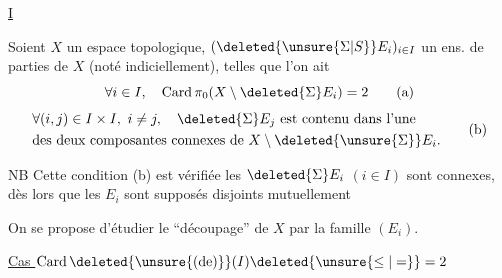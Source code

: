 \begingroup
\makeatletter
\tagsleft@true
\makeatother
\uline{ I}

Soient $X$ un espace topologique, $(\deleted{\unsure{\Sigma|S}}E_i)_{i\in I}$ un ens. de parties  de $X$ (noté indiciellement), telles que l'on ait
\reversemarginpar
{}
\normalmarginpar
\[
 \forall i\in I,\quad \operatorname{Card}\pi_0(X\setminus\deleted{\Sigma}E_i)=2
 \tag*{(a)}
\]
\[
 \begin{aligned}
 &\forall(i,j)\in I\times I,\ i\ne j,\quad \deleted{\Sigma}E_j\ \text{est contenu dans l'une}\\
 &\text{des deux composantes connexes de }X\setminus\deleted{\unsure{\Sigma}}E_i.
 \end{aligned}
 \tag*{(b)}
\]

NB Cette condition (b) est vérifiée  les $\deleted{\Sigma}E_i$ $(i\in I)$ sont connexes, dès lors que les $E_i$ sont supposés disjoints mutuellement

On se propose d'étudier le ``découpage'' de $X$ par la famille $(E_i)$.

\uline{Cas $\operatorname{Card}\deleted{\unsure{(\mathrm{de})}}(I)\deleted{\unsure{\leq|=}}=2$}

